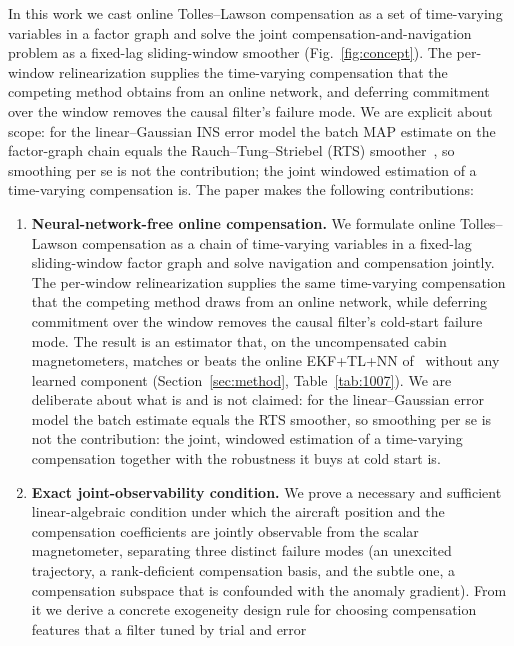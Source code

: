 \documentclass{IEEEtaes}
\begin{document}
In this work we cast online Tolles--Lawson compensation as a set of time-varying
variables in a factor graph and solve the joint compensation-and-navigation
problem as a fixed-lag sliding-window smoother (Fig.~\ref{fig:concept}). The
per-window relinearization
supplies the time-varying compensation that the competing method obtains from an
online network, and deferring commitment over the window removes the causal
filter's failure mode. We are explicit about scope: for the linear--Gaussian INS
error model the batch MAP estimate on the factor-graph chain equals the
Rauch--Tung--Striebel (RTS) smoother~\cite{rauch1965}, so smoothing per se is not
the contribution; the joint windowed estimation of a time-varying compensation is.
The paper makes the following contributions:
\begin{enumerate}
  \item \textbf{Neural-network-free online compensation.} We formulate online
        Tolles--Lawson compensation as a chain of time-varying variables in a
        fixed-lag sliding-window factor graph and solve navigation and
        compensation jointly. The per-window relinearization supplies the same
        time-varying compensation that the competing method draws from an online
        network, while deferring commitment over the window removes the causal
        filter's cold-start failure mode. The result is an estimator that, on the
        uncompensated cabin magnetometers, matches or beats the online EKF+TL+NN
        of~\cite{hager2026} without any learned component (Section~\ref{sec:method},
        Table~\ref{tab:1007}). We are deliberate about what is and is not claimed:
        for the linear--Gaussian error model the batch estimate equals the RTS
        smoother, so smoothing per se is not the contribution: the joint,
        windowed estimation of a time-varying compensation together with
        the robustness it buys at cold start is.
  \item \textbf{Exact joint-observability condition.} We prove a necessary and
        sufficient linear-algebraic condition under which the aircraft position
        and the compensation coefficients are jointly observable from the
        scalar magnetometer, separating three distinct failure modes (an
        unexcited trajectory, a rank-deficient compensation basis, and the
        subtle one, a compensation subspace that is confounded with the anomaly
        gradient). From it we derive a concrete exogeneity design rule for
        choosing compensation features that a filter tuned by trial and error

\end{enumerate}
\end{document}
